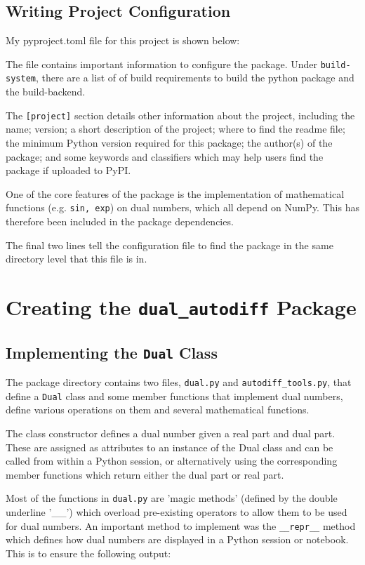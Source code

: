 \documentclass{article}
\begin{document}
\subsection{Writing Project Configuration}
My pyproject.toml file for this project is shown below:



The file contains important information to configure the package. Under \texttt{build-system}, there are a list of of build requirements to build the python package and the build-backend.

The \texttt{[project]} section details other information about the project, including the name; version; a short description of the project; where to find the readme file; the minimum Python version required for this package; the author(s) of the package; and some keywords and classifiers which may help users find the package if uploaded to PyPI. 

One of the core features of the package is the implementation of mathematical functions (e.g. \texttt{sin, exp}) on dual numbers, which all depend on NumPy. This has therefore been included in the package dependencies.

The final two lines tell the configuration file to find the package in the same directory level that this file is in.

\section{ Creating the \texttt{dual\_autodiff} Package}

\subsection{Implementing the \texttt{Dual} Class}

The package directory contains two files, \texttt{dual.py} and \texttt{autodiff\_tools.py}, that define a \texttt{Dual} class and some member functions that implement dual numbers, define various operations on them and several mathematical functions. 

The class constructor defines a dual number given a real part and dual part. These are assigned as attributes to an instance of the Dual class and can be called from within a Python session, or alternatively using the corresponding member functions which return either the dual part or real part. 

Most of the functions in \texttt{dual.py} are 'magic methods' (defined by the double underline '\_\_') which overload pre-existing operators to allow them to be used for dual numbers. An important method to implement was the \texttt{\_\_repr\_\_} method which defines how dual numbers are displayed in a Python session or notebook. This is to ensure the following output: 
\end{document}
